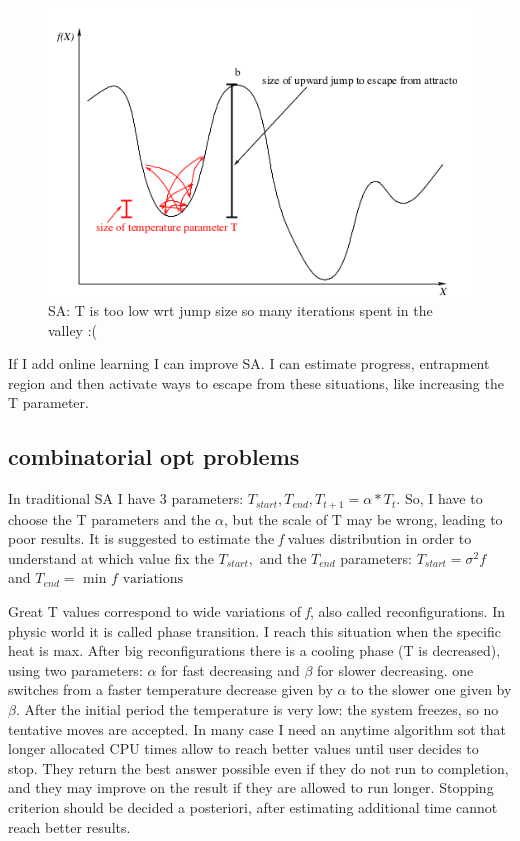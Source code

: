 \documentclass[11pt]{article}
\begin{document}
\begin{figure}[H]
\includegraphics[scale=0.40]{sa}
\caption{SA: T is too low wrt jump size so many iterations spent in the valley :( }
\centering
\end{figure}

If I add online learning I can improve SA. I can estimate progress, entrapment region and then activate ways to escape from these situations, like increasing the T parameter.

\subsection{combinatorial opt problems}
In traditional SA I have 3 parameters: $ T_{start}, T_{end}, T_{t+1} = \alpha * T_t $. So, I have to choose the T parameters and the $ \alpha $, but the scale of T may be wrong, leading to poor results. It is suggested to estimate the \textit{f} values distribution in order to understand at which value fix the $ T_{start}, \text{ and the } T_{end} $ parameters: $ T_{start} = \sigma^2 f $ and $ T_{end} = \text{ min } f \text{ variations} $

Great T values correspond to wide variations of \textit{f}, also called reconfigurations. In physic world it is called phase transition. I reach this situation when the specific heat is max. After big reconfigurations there is a cooling phase (T is decreased), using two parameters: $ \alpha $ for fast decreasing and $ \beta $ for slower decreasing. one switches from a faster temperature decrease given by $ \alpha $ to the slower one given by $ \beta $.
After the initial period the temperature is very low: the system freezes, so no tentative moves are accepted. In many case I need an anytime algorithm sot that longer allocated CPU times allow to reach better values until user decides to stop. They return the best answer possible even if they do not run to completion, and they may improve on the result if they are allowed to run longer. Stopping criterion should be decided a posteriori, after estimating additional time cannot reach better results. 
\end{document}

